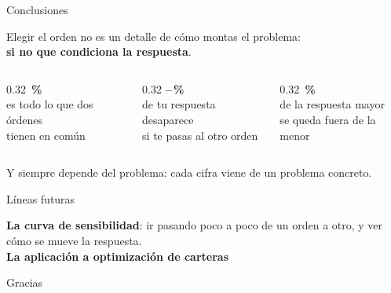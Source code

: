\documentclass[aspectratio=169,11pt]{beamer}
\newcommand{\cita}[1]{\textcolor{gris}{\small #1}}
\begin{document}
\begin{frame}{Conclusiones}
  \vspace{4mm}
  \begin{center}
    \begin{minipage}{0.88\textwidth}
      {\large Elegir el orden no es un detalle de cómo montas el problema:\\
      \textbf{si no que condiciona la respuesta}.}
    \end{minipage}
  \end{center}
  \vspace{8mm}
  \begin{columns}[T,onlytextwidth]
    \begin{column}{0.32\textwidth}
      \centering
      {\LARGE\textbf{\pUnionShare\,\%}}\\[3mm]
      {\small es todo lo que dos órdenes\\ tienen en común}\\[2mm]
    \end{column}
    \begin{column}{0.32\textwidth}
      \centering
      {\LARGE\textbf{\bMinInt--\bMaxInt\,\%}}\\[3mm]
      {\small de tu respuesta desaparece\\ si te pasas al otro orden}\\[2mm]
    \end{column}
    \begin{column}{0.32\textwidth}
      \centering
      {\LARGE\textbf{\iLsOutsideCw\,\%}}\\[3mm]
      {\small de la respuesta mayor\\ se queda fuera de la menor}\\[2mm]
    \end{column}
  \end{columns}
  \vspace{7mm}
  \begin{center}
    \cita{Y siempre depende del problema: cada cifra viene de un problema concreto.}
  \end{center}
  \NotaXIV
\end{frame}

\begin{frame}{Líneas futuras}
  \vspace{10mm}
  \begin{center}
    \begin{minipage}{0.82\textwidth}
      {\large
      \textbf{La curva de sensibilidad}: ir pasando poco a poco de un orden a
      otro, y ver cómo se mueve la respuesta.\\[8mm]
      \textbf{La aplicación a optimización de carteras}}
    \end{minipage}
  \end{center}
  \NotaXV
\end{frame}

\begin{frame}[plain]
  \vspace{10mm}
  \begin{center}
    {\Huge Gracias}\\[10mm]
  \end{center}
\end{frame}
\end{document}
